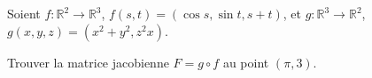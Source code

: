 \begin{exercice}\label{exodevoir2-0004}
 
Soient $f:\mathbb{R}^2\to \mathbb{R}^3$, $f(s,t)=(\cos s, \sin t, s+t)$, et $g:\mathbb{R}^3\to \mathbb{R}^2$, $g(x,y,z)=(x^2+y^2, z^2x)$. 

Trouver la matrice jacobienne $F=g\circ f$ au point $(\pi, 3)$.


\end{exercice}


